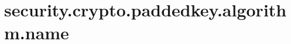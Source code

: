 \section{security.crypto.paddedkey.algorithm.name}
\label{configuration:SecurityCryptoPaddedkeyAlgorithmName}
\TODO

